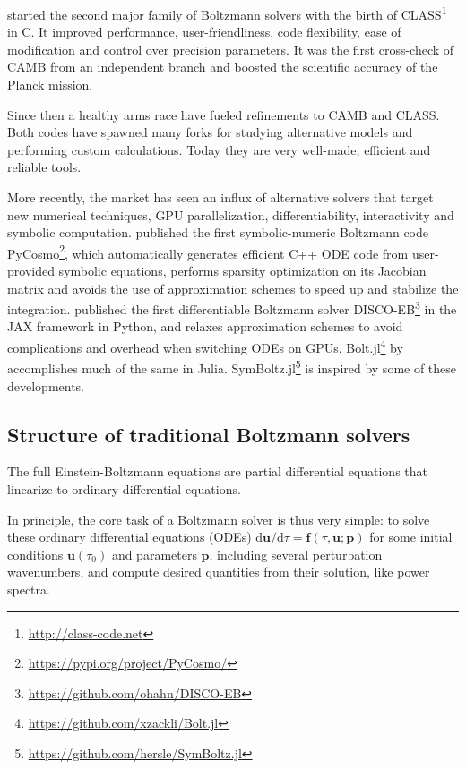\documentclass{aa}
\begin{document}
\cite{lesgourguesCosmicLinearAnisotropy2011,blasCosmicLinearAnisotropy2011a} started the second major family of Boltzmann solvers with the birth of CLASS\footnote{\url{http://class-code.net}} in C.
It improved performance, user-friendliness, code flexibility, ease of modification and control over precision parameters.
It was the first cross-check of CAMB from an independent branch and boosted the scientific accuracy of the Planck mission.

Since then a healthy arms race have fueled refinements to CAMB and CLASS.
Both codes have spawned many forks for studying alternative models and performing custom calculations.
Today they are very well-made, efficient and reliable tools.

More recently, the market has seen an influx of alternative solvers that target new numerical techniques, GPU parallelization, differentiability, interactivity and symbolic computation.
\cite{refregierPyCosmoIntegratedCosmological2017a} published the first symbolic-numeric Boltzmann code PyCosmo\footnote{\url{https://pypi.org/project/PyCosmo/}}, which automatically generates efficient C++ ODE code from user-provided symbolic equations, performs sparsity optimization on its Jacobian matrix and avoids the use of approximation schemes to speed up and stabilize the integration.
\cite{hahnDISCODJDifferentiableEinsteinBoltzmann2024} published the first differentiable Boltzmann solver DISCO-EB\footnote{\url{https://github.com/ohahn/DISCO-EB}} in the JAX framework in Python, and relaxes approximation schemes to avoid complications and overhead when switching ODEs on GPUs.
Bolt.jl\footnote{\url{https://github.com/xzackli/Bolt.jl}} by \cite{liBoltjl2023} accomplishes much of the same in Julia.
SymBoltz.jl\footnote{\url{https://github.com/hersle/SymBoltz.jl}} is inspired by some of these developments.

\subsection{Structure of traditional Boltzmann solvers}
\label{sec:intro_structure}

The full Einstein-Boltzmann equations are partial differential equations
that linearize to ordinary differential equations.

In principle, the core task of a Boltzmann solver is thus very simple:
to solve these ordinary differential equations (ODEs) ${\mathrm{d}\mathbf{u}}/{\mathrm{d} \tau} = \mathbf{f}(\tau,\mathbf{u};\mathbf{p})$ for some initial conditions $\mathbf{u}(\tau_0)$ and parameters $\mathbf{p}$, including several perturbation wavenumbers, and compute desired quantities from their solution, like power spectra.
\end{document}

